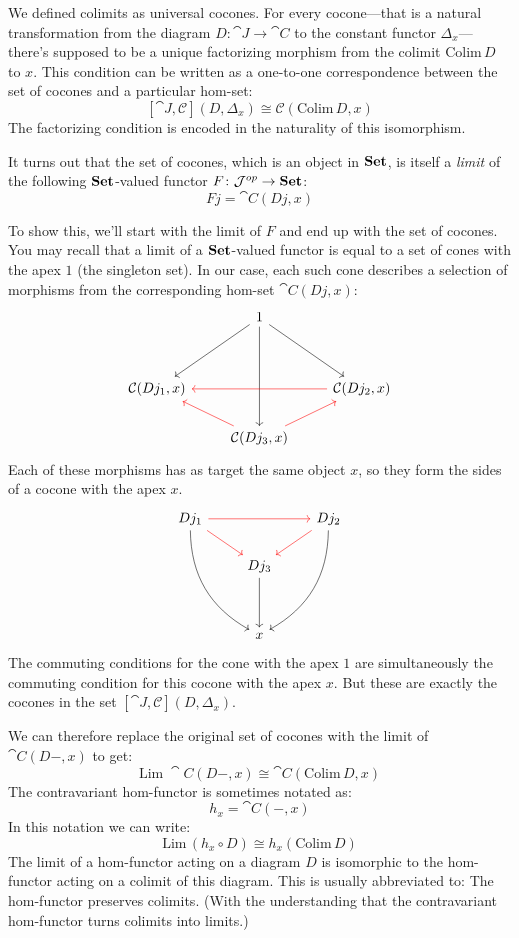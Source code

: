 \documentclass[DaoFP]{subfiles}
\begin{document}
We defined colimits as universal cocones. For every cocone---that is a natural transformation from the diagram $D \colon \cat J \to \cat C$ to the constant functor $\Delta_x$---there's supposed to be a unique factorizing morphism from the colimit $\text{Colim}\, D$ to $x$. This condition can be written as a one-to-one correspondence between the set of cocones and a particular hom-set:
\[ [\cat J, \mathcal{C}](D, \Delta_x)  \cong \mathcal{C}( \text{Colim} \, D, x) \]
The factorizing condition is encoded in the naturality of this isomorphism.

It turns out that the set of cocones, which is an object in $\mathbf{Set}$, is itself a \emph{limit} of the following $\mathbf{Set}$-valued functor $F \colon \mathcal{J}^{op} \to \mathbf{Set}$:
\[ F j = \cat C(D j, x) \]

To show this, we'll start with the limit of $F$ and end up with the set of cocones. You may recall that a limit of a $\mathbf{Set}$-valued functor is equal to a set of cones with the apex $1$ (the singleton set). In our case, each such cone describes a selection of morphisms from the corresponding hom-set $\cat C(D j, x)$:
\[
 \begin{tikzcd}
  & 1
\arrow[ddr, ""]
 \arrow[ddl, ""']
 \arrow[ddd, ""]
 \\
\\
\cat C( D j_1, x)
&& \cat C( D j_2, x)
\arrow[ll, red]
\\
& \cat C( D j_3, x)
\arrow[lu, red]
\arrow[ru, red]
 \end{tikzcd}
\]
Each of these morphisms has as target the same object $x$, so they form the sides of a cocone with the apex $x$. 
\[
\begin{tikzcd}
 D j_1
 \arrow[rr, red]
 \arrow[dr, red]
 \arrow[dddr, bend right, ""']
&& D j_2
\arrow[dl, red]
 \arrow[dddl, bend left,  ""]
 \\
 & D j_3
 \arrow[dd, ""]
 \\
 \\
 & x
 \end{tikzcd}
 \]
The commuting conditions for the cone with the apex $1$ are simultaneously the commuting condition for this cocone with the apex $x$. But these are exactly the cocones in the set $ [\cat J, \mathcal{C}](D, \Delta_x)$.

We can therefore replace the original set of cocones with the limit of $\cat C (D-, x)$ to get:
\[ \text{Lim}\; \cat C (D-, x) \cong \cat C( \text{Colim}\,  D, x) \]
The contravariant hom-functor is sometimes notated as:
\[ h_x = \cat C(-, x) \]
In this notation we can write:
\[ \text{Lim} \, (h_x \circ D) \cong h_x (\text{Colim} \, D) \]
The limit of a hom-functor acting on a diagram $D$ is isomorphic to the hom-functor acting on a colimit of this diagram. This is usually abbreviated to: The hom-functor preserves colimits. (With the understanding that the contravariant hom-functor turns colimits into limits.)
\end{document}
